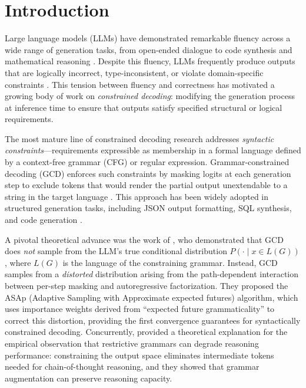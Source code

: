\documentclass[twoside,11pt]{article}
\begin{document}
\section{Introduction}
\label{sec:introduction}

Large language models (LLMs) have demonstrated remarkable fluency across a
wide range of generation tasks, from open-ended dialogue to code synthesis
and mathematical reasoning \citep{brown2020language, touvron2023llama}.
Despite this fluency, LLMs frequently produce outputs that are logically
incorrect, type-inconsistent, or violate domain-specific constraints
\citep{chen2021evaluating, mirzadeh2024gsm}. This tension between
fluency and correctness has motivated a growing body of work on
\emph{constrained decoding}: modifying the generation process at inference
time to ensure that outputs satisfy specified structural or logical
requirements.

The most mature line of constrained decoding research addresses
\emph{syntactic constraints}---requirements expressible as membership in a
formal language defined by a context-free grammar (CFG) or regular
expression. Grammar-constrained decoding (GCD) enforces such constraints by
masking logits at each generation step to exclude tokens that would render
the partial output unextendable to a string in the target language
\citep{hokamp2017lexically, post2018fast, scholak2021picard}. This
approach has been widely adopted in structured generation tasks, including
JSON output formatting, SQL synthesis, and code generation
\citep{beurerkellner2024domino}.

A pivotal theoretical advance was the work of \citet{ugare2024gad}, who
demonstrated that GCD does \emph{not} sample from the LLM's true conditional
distribution $P(\cdot \mid x \in L(G))$, where $L(G)$ is the language of the
constraining grammar. Instead, GCD samples from a \emph{distorted}
distribution arising from the path-dependent interaction between per-step
masking and autoregressive factorization. They proposed the ASAp (Adaptive
Sampling with Approximate expected futures) algorithm, which uses importance
weights derived from ``expected future grammaticality'' to correct this
distortion, providing the first convergence guarantees for syntactically
constrained decoding. Concurrently, \citet{banerjee2025crane} provided a
theoretical explanation for the empirical observation that restrictive
grammars can degrade reasoning performance: constraining the output space
eliminates intermediate tokens needed for chain-of-thought reasoning, and
they showed that grammar augmentation can preserve reasoning capacity.
\end{document}
